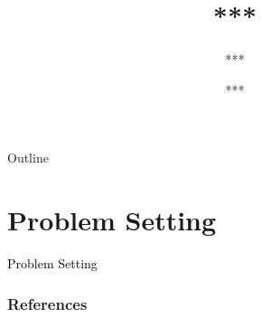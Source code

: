\documentclass[10pt,xcolor={dvipsnames}]{beamer}
\title{***}
\date{***}
\author{***}
\begin{document}
%
{%
  \begin{frame}[noframenumbering]
    \titlepage
  \end{frame}
}
%
\begin{frame}{Outline}
  \tableofcontents
\end{frame}
%
\section{Problem Setting}
%
\begin{frame}[noframenumbering]
  \begin{center}
  { \Huge \textcolor{black}{Problem Setting} }
  \end{center}
\end{frame}


\begin{frame}[t,allowframebreaks]
  \frametitle{References}
  
  
\end{frame}

\end{document}
